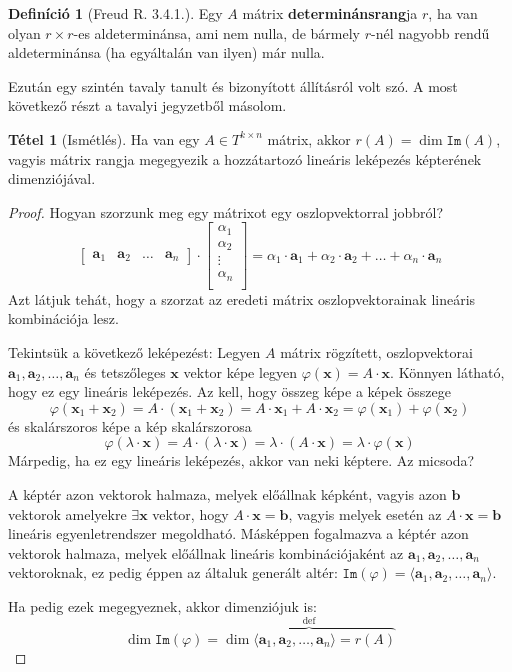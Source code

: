 \documentclass[12pt]{book}
\theoremstyle{plain} %
\theoremstyle{definition} %
\newtheorem{defi/}{Definíció}[section]
\newenvironment{defi}
  {\renewcommand{\qedsymbol}{$\clubsuit$}%
   \pushQED{\qed}\begin{defi/}}
  {\popQED\end{defi/}}
\newtheorem{theo/}{Tétel}[section]
\newenvironment{theo}
  {\renewcommand{\qedsymbol}{$\clubsuit$}%
   \pushQED{\qed}\begin{theo/}}
  {\popQED\end{theo/}}
\theoremstyle{remark}
\renewcommand\qedsymbol{$\blacksquare$}
\numberwithin{equation}{section}  %
\begin{document}
	\begin{defi}[Freud R. 3.4.1.]
		Egy $A$ mátrix \textbf{determinánsrang}ja $r$, ha van olyan $r\times r$-es aldeterminánsa, ami nem nulla, de bármely $r$-nél nagyobb rendű aldeterminánsa (ha egyáltalán van ilyen) már nulla. 
	\end{defi}
	
	Ezután egy szintén tavaly tanult és bizonyított állításról volt szó. A most következő részt a tavalyi jegyzetből másolom.
	
	\begin{theo}[Ismétlés]\label{rangkepter}
		Ha van egy $A\in T^{k\times n}$ mátrix, akkor $r(A)=\dim\mathtt{Im}(A)$, vagyis mátrix rangja megegyezik a hozzátartozó lineáris leképezés képterének dimenziójával.
	\end{theo}
	
	\begin{proof}
		Hogyan szorzunk meg egy mátrixot egy oszlopvektorral jobbról?
		\[\begin{bmatrix}
		\mathbf{a}_1 & \mathbf{a}_2 & \ldots & \mathbf{a}_n
		\end{bmatrix}\cdot \begin{bmatrix}
		\alpha_1 \\
		\alpha_2 \\
		\vdots \\
		\alpha_n \\
		\end{bmatrix}=\alpha_1\cdot \mathbf{a}_1+\alpha_2\cdot \mathbf{a}_2+\ldots+\alpha_n\cdot \mathbf{a}_n\]
		Azt látjuk tehát, hogy a szorzat az eredeti mátrix oszlopvektorainak lineáris kombinációja lesz.
		
		Tekintsük a következő leképezést: Legyen $A$ mátrix rögzített, oszlopvektorai $\mathbf{a}_1,\mathbf{a}_2,\ldots,\mathbf{a}_n$ és tetszőleges $\mathbf{x}$ vektor képe legyen $\varphi(\mathbf{x})=A\cdot \mathbf{x}$. Könnyen látható, hogy ez egy lineáris leképezés. Az kell, hogy összeg képe a képek összege
		\[\varphi(\mathbf{x}_1+\mathbf{x}_2)=A\cdot(\mathbf{x}_1+\mathbf{x}_2)=A\cdot \mathbf{x}_1+A\cdot \mathbf{x}_2 = \varphi(\mathbf{x}_1)+\varphi(\mathbf{x}_2)\]
		és skalárszoros képe a kép skalárszorosa
		\[\varphi(\lambda\cdot \mathbf{x})=A\cdot (\lambda\cdot \mathbf{x})=\lambda\cdot (A\cdot \mathbf{x})=\lambda\cdot \varphi(\mathbf{x})\]
		Márpedig, ha ez egy lineáris leképezés, akkor van neki képtere. Az micsoda?
		
		A képtér azon vektorok halmaza, melyek előállnak képként, vagyis azon $\mathbf{b}$ vektorok amelyekre $\exists \mathbf{x}$ vektor, hogy $A\cdot \mathbf{x}=\mathbf{b}$, vagyis melyek esetén az $A\cdot \mathbf{x}=\mathbf{b}$ lineáris egyenletrendszer megoldható. Másképpen fogalmazva a képtér azon vektorok halmaza, melyek előállnak lineáris kombinációjaként az $\mathbf{a}_1,\mathbf{a}_2,\ldots,\mathbf{a}_n$ vektoroknak, ez pedig éppen az általuk generált altér: $\mathtt{Im}(\varphi)=\langle \mathbf{a}_1,\mathbf{a}_2,\ldots,\mathbf{a}_n \rangle$.
		
		Ha pedig ezek megegyeznek, akkor dimenziójuk is:
		\[ \dim \mathtt{Im}(\varphi) = \overbrace{\dim \langle \mathbf{a}_1,\mathbf{a}_2,\ldots,\mathbf{a}_n \rangle = r(A)}^{\text{def}} \]
	\end{proof}
	
\end{document}
